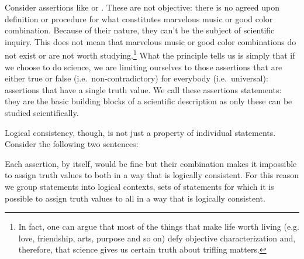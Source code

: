 Consider assertions like  or . These are not objective: there is no agreed upon definition or procedure for what constitutes marvelous music or good color combination. Because of their nature, they can't be the subject of scientific inquiry. This does not mean that marvelous music or good color combinations do not exist or are not worth studying.\footnote{In fact, one can argue that most of the things that make life worth living (e.g. love, friendship, arts, purpose and so on) defy objective characterization and, therefore, that science gives us certain truth about trifling matters.} What the principle tells us is simply that if we choose to do science, we are limiting ourselves to those assertions that are either true or false (i.e.~non-contradictory) for everybody (i.e.~universal): assertions that have a single truth value. We call these assertions statements: they are the basic building blocks of a scientific description as only these can be studied scientifically.

Logical consistency, though, is not just a property of individual statements. Consider the following two sentences:
\begin{description}
	\item {}
	\item {}
\end{description}
Each assertion, by itself, would be fine but their combination makes it impossible to assign truth values to both in a way that is logically consistent. For this reason we group statements into logical contexts, sets of statements for which it is possible to assign truth values to all in a way that is logically consistent.

